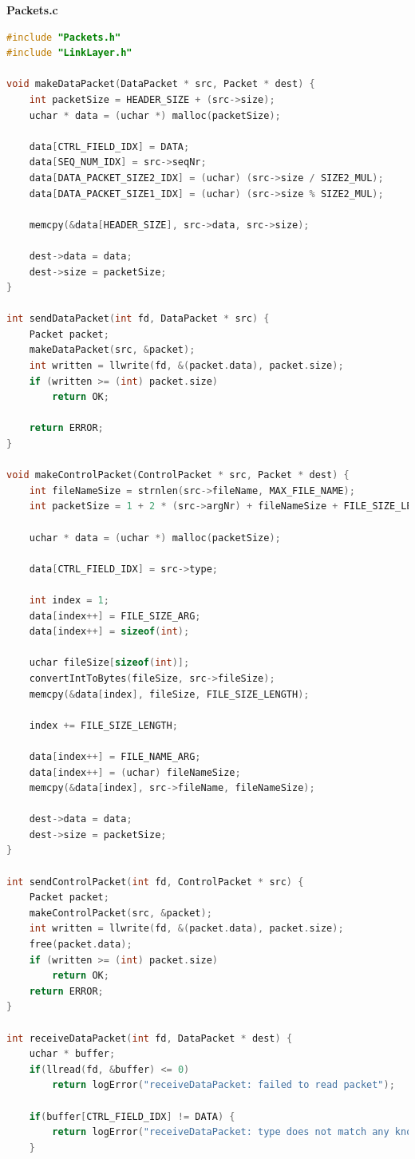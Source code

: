 \documentclass[a4paper, 11pt]{article}
\begin{document}
\huge\textbf{Packets.c}
\begin{lstlisting}[language=C]
#include "Packets.h"
#include "LinkLayer.h"

void makeDataPacket(DataPacket * src, Packet * dest) {
	int packetSize = HEADER_SIZE + (src->size);
	uchar * data = (uchar *) malloc(packetSize);

	data[CTRL_FIELD_IDX] = DATA;
	data[SEQ_NUM_IDX] = src->seqNr;
	data[DATA_PACKET_SIZE2_IDX] = (uchar) (src->size / SIZE2_MUL);
	data[DATA_PACKET_SIZE1_IDX] = (uchar) (src->size % SIZE2_MUL);

	memcpy(&data[HEADER_SIZE], src->data, src->size);

	dest->data = data;
	dest->size = packetSize;
}

int sendDataPacket(int fd, DataPacket * src) {
	Packet packet;
	makeDataPacket(src, &packet);
	int written = llwrite(fd, &(packet.data), packet.size);
	if (written >= (int) packet.size)
		return OK;

	return ERROR;
}

void makeControlPacket(ControlPacket * src, Packet * dest) {
	int fileNameSize = strnlen(src->fileName, MAX_FILE_NAME);
	int packetSize = 1 + 2 * (src->argNr) + fileNameSize + FILE_SIZE_LENGTH;

	uchar * data = (uchar *) malloc(packetSize);

	data[CTRL_FIELD_IDX] = src->type;

	int index = 1;
	data[index++] = FILE_SIZE_ARG;
	data[index++] = sizeof(int);

	uchar fileSize[sizeof(int)];
	convertIntToBytes(fileSize, src->fileSize);
	memcpy(&data[index], fileSize, FILE_SIZE_LENGTH);

	index += FILE_SIZE_LENGTH;

	data[index++] = FILE_NAME_ARG;
	data[index++] = (uchar) fileNameSize;
	memcpy(&data[index], src->fileName, fileNameSize);

	dest->data = data;
	dest->size = packetSize;
}

int sendControlPacket(int fd, ControlPacket * src) {
	Packet packet;
	makeControlPacket(src, &packet);
	int written = llwrite(fd, &(packet.data), packet.size);
	free(packet.data);
	if (written >= (int) packet.size)
		return OK;
	return ERROR;
}

int receiveDataPacket(int fd, DataPacket * dest) {
	uchar * buffer;
	if(llread(fd, &buffer) <= 0)
		return logError("receiveDataPacket: failed to read packet");

	if(buffer[CTRL_FIELD_IDX] != DATA) {
		return logError("receiveDataPacket: type does not match any known type DATA");
	}


\end{lstlisting}
\end{document}
